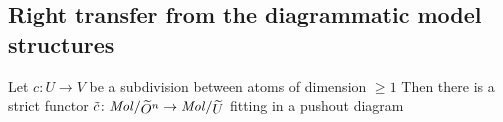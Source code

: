 \subsection{Right transfer from the diagrammatic model structures}

\begin{lem} \label{lem:pushout_with_localisation}
    Let \( c \colon U \to V \) be a subdivision between atoms of dimension \( \geq 1 \)
    Then there is a strict functor \( \td{c} \colon \molecin{\rglobe{n}} \to \molecin{\selfloc U} \) fitting in a pushout diagram
    \begin{center}
    \end{center}
\end{lem}
